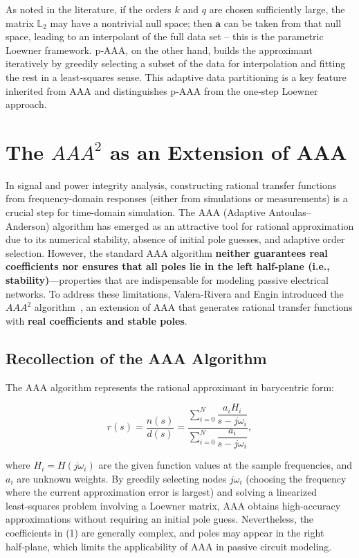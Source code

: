 \documentclass{article}
\begin{document}
\begin{remark}
As noted in the literature, if the orders \(k\) and \(q\) are chosen sufficiently large, the matrix \(\mathbb{L}_2\) may have a nontrivial null space; then \(\mathbf{a}\) can be taken from that null space, leading to an interpolant of the full data set – this is the parametric Loewner framework. p‑AAA, on the other hand, builds the approximant iteratively by greedily selecting a subset of the data for interpolation and fitting the rest in a least‑squares sense. This adaptive data partitioning is a key feature inherited from AAA and distinguishes p‑AAA from the one‑step Loewner approach.
\end{remark}


\section{The $AAA^{2}$ as an Extension of AAA}

In signal and power integrity analysis, constructing rational transfer functions from frequency-domain responses (either from simulations or measurements) is a crucial step for time-domain simulation. The AAA (Adaptive Antoulas–Anderson) algorithm has emerged as an attractive tool for rational approximation due to its numerical stability, absence of initial pole guesses, and adaptive order selection. However, the standard AAA algorithm \textbf{neither guarantees real coefficients nor ensures that all poles lie in the left half-plane (i.e., stability)}—properties that are indispensable for modeling passive electrical networks. To address these limitations, Valera-Rivera and Engin introduced the $AAA^{2}$ algorithm~\cite{ref4}, an extension of AAA that generates rational transfer functions with \textbf{real coefficients and stable poles}.

\subsection{Recollection of the AAA Algorithm}

The AAA algorithm represents the rational approximant in barycentric form:

\[
r(s) = \frac{n(s)}{d(s)} = \frac{\sum_{i=0}^{N} \dfrac{a_i H_i}{s - j\omega_i}}{\sum_{i=0}^{N} \dfrac{a_i}{s - j\omega_i}}, \tag{1}
\]

where \(H_i = H(j\omega_i)\) are the given function values at the sample frequencies, and \(a_i\) are unknown weights. By greedily selecting nodes \(j\omega_i\) (choosing the frequency where the current approximation error is largest) and solving a linearized least‑squares problem involving a Loewner matrix, AAA obtains high‑accuracy approximations without requiring an initial pole guess. Nevertheless, the coefficients in (1) are generally complex, and poles may appear in the right half‑plane, which limits the applicability of AAA in passive circuit modeling.
\end{document}
